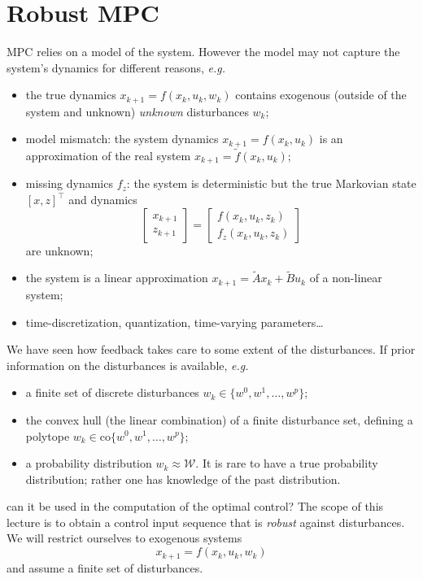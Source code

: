 \chapter{Robust MPC}
\label{chap:robust-MPC}

MPC relies on a model of the system. However the model may not capture the system's dynamics for different reasons, \textit{e.g.}
\begin{itemize}
\item the true dynamics $x_{k+1} = f(x_k,u_k,w_k)$ contains exogenous (outside of the system and unknown) \emph{unknown} disturbances $w_k$;
\item model mismatch: the system dynamics $x_{k+1} = f(x_k,u_k)$ is an approximation of the real system $x_{k+1} = \tilde{f}(x_k,u_k)$;
\item missing dynamics $f_z$: the system is deterministic but the true Markovian state $[x,z]^\top$ and dynamics
  \begin{equation*}
    \begin{bmatrix}
      x_{k+1} \\ z_{k+1}
    \end{bmatrix} =
    \begin{bmatrix}
      f(x_k,u_k,z_k) \\ f_z(x_k,u_k,z_k)
    \end{bmatrix}
  \end{equation*}
  are unknown;
\item the system is a linear approximation $x_{k+1} = \tilde{A}x_k + \tilde{B}u_k$ of a non-linear system;
\item time-discretization, quantization, time-varying parameters\ldots
\end{itemize}
We have seen how feedback takes care to some extent of the disturbances. If prior information on the disturbances is available, \textit{e.g.}
\begin{itemize}
\item a finite set of discrete disturbances $w_k\in \{w^0, w^1,\ldots, w^p \}$;
\item the convex hull (the linear combination) of a finite disturbance set, defining a polytope $w_k\in \text{co}\{w^0, w^1,\ldots, w^p \}$;
\item a probability distribution $w_k \approx \mathcal{W}$. It is rare to have a true probability distribution; rather one has knowledge of the past distribution.
\end{itemize}
can it be used in the computation of the optimal control? The scope of this lecture is to obtain a control input sequence that is \emph{robust} against disturbances. We will restrict ourselves to exogenous systems
\begin{equation*}
  x_{k+1} = f(x_k,u_k,w_k)
\end{equation*}
and assume a finite set of disturbances.

